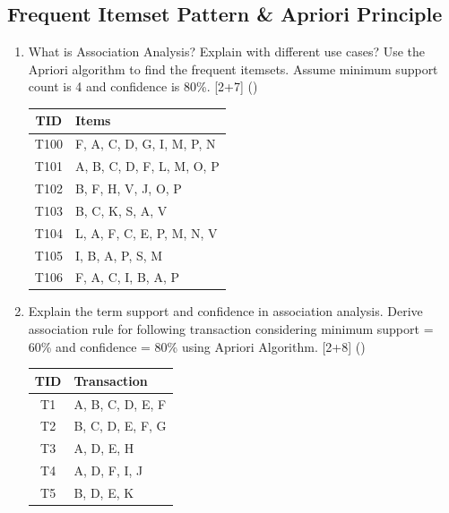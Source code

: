 \documentclass[12pt]{article}
\begin{document}
  \subsection{Frequent Itemset Pattern \& Apriori Principle}
    \begin{enumerate}[topsep=0pt, noitemsep]
      \item What is Association Analysis? Explain with different use cases? Use the Apriori algorithm to find the frequent itemsets. Assume minimum support count is 4 and confidence is 80\%. \hfill [2+7] ()\\
        \small
        \begin{tabular}{|c|l|}
          \hline
          TID & Items \\ \hline
          T100 & F, A, C, D, G, I, M, P, N \\ \hline
          T101 & A, B, C, D, F, L, M, O, P \\ \hline
          T102 & B, F, H, V, J, O, P \\ \hline
          T103 & B, C, K, S, A, V \\ \hline
          T104 & L, A, F, C, E, P, M, N, V \\ \hline
          T105 & I, B, A, P, S, M \\ \hline
          T106 & F, A, C, I, B, A, P \\ \hline
        \end{tabular}
        \normalsize

      \item Explain the term support and confidence in association analysis. Derive association rule for following transaction considering minimum support = 60\% and confidence = 80\% using Apriori Algorithm. \hfill [2+8] ()\\
        \small
        \begin{tabular}{|c|l|}
          \hline
          TID & Transaction \\ \hline
          T1 & A, B, C, D, E, F \\ \hline
          T2 & B, C, D, E, F, G \\ \hline
          T3 & A, D, E, H \\ \hline
          T4 & A, D, F, I, J \\ \hline
          T5 & B, D, E, K \\ \hline
        \end{tabular}
        \normalsize


\end{enumerate}
\end{document}
